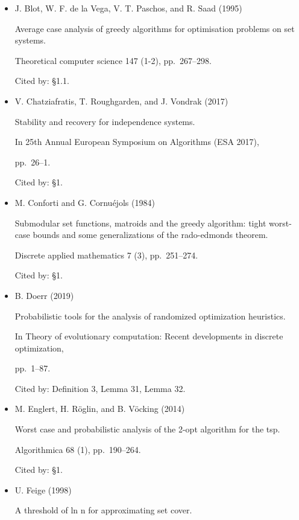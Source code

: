 \documentclass[10pt,a4paper]{article}
\begin{document}
\begin{itemize}
\item[] [6]
J. Blot, W. F. de la Vega, V. T. Paschos, and R. Saad (1995)

Average case analysis of greedy algorithms for optimisation problems on set systems.

Theoretical computer science 147 (1-2), pp. 267–298.

Cited by: §1.1.



\item[] [7]
V. Chatziafratis, T. Roughgarden, and J. Vondrak (2017)

Stability and recovery for independence systems.

In 25th Annual European Symposium on Algorithms (ESA 2017),

pp. 26–1.

Cited by: §1.



\item[] [8]
M. Conforti and G. Cornuéjols (1984)

Submodular set functions, matroids and the greedy algorithm: tight worst-case bounds and some generalizations of the rado-edmonds theorem.

Discrete applied mathematics 7 (3), pp. 251–274.

Cited by: §1.



\item[] [9]
B. Doerr (2019)

Probabilistic tools for the analysis of randomized optimization heuristics.

In Theory of evolutionary computation: Recent developments in discrete optimization,

pp. 1–87.

Cited by: Definition 3,
Lemma 31,
Lemma 32.



\item[] [10]
M. Englert, H. Röglin, and B. Vöcking (2014)

Worst case and probabilistic analysis of the 2-opt algorithm for the tsp.

Algorithmica 68 (1), pp. 190–264.

Cited by: §1.



\item[] [11]
U. Feige (1998)

A threshold of ln n for approximating set cover.


\end{itemize}
\end{document}
